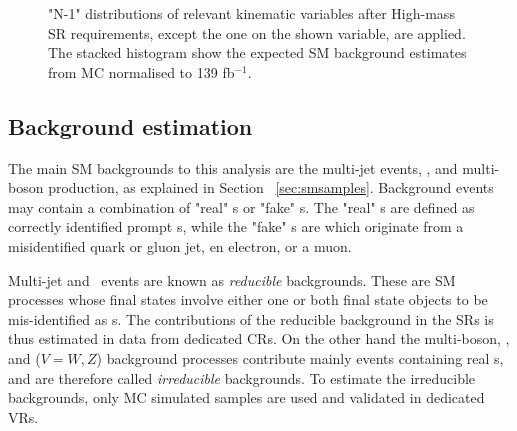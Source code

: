 	 \begin{figure}[!hbt]
	\begin{center}
			\hspace{0.05\textwidth}	 
			 \hspace{0.05\textwidth}
			\hspace{0.05\textwidth}	 
			 \hspace{0.05\textwidth}
		\end{center}
		\caption{"N-1" distributions of relevant kinematic variables after High-mass \ac{SR} requirements, except the one on the shown variable, are applied. The stacked histogram show the expected \ac{SM} background estimates from \ac{MC} normalised to 139 fb$^{-1}$.}
	\label{fig:SRH_analysis_N_1}
	\end{figure}	
	
	\subsection{Background estimation}
	\label{subsec:CRest}
	The main \ac{SM} backgrounds to this analysis are the multi-jet events, \Wjets, and multi-boson production, as explained in Section ~\ref{sec:smsamples}. Background events may contain a combination of "real" \ltau s or "fake" \ltau s. 
	The "real" \ltau s are defined as correctly identified prompt \htau s, while the "fake" \ltau s are which originate from a misidentified quark or gluon jet, en electron, or a muon.
	
	Multi-jet and \Wjets\ events are known as \textit{reducible} backgrounds. These are \ac{SM} processes whose final states involve either one or both final state objects to be mis-identified as \ltau s. 
	The contributions of the reducible background in the \acp{SR}  is thus estimated in data from dedicated \acp{CR}. 
	On the other hand the multi-boson, \Zjets, and \ttV ($V=W,Z$) background processes contribute mainly events containing real \ltau s, and are therefore called \textit{irreducible} backgrounds. To estimate the irreducible backgrounds, only \ac{MC} simulated samples are used and validated in dedicated \acp{VR}.
